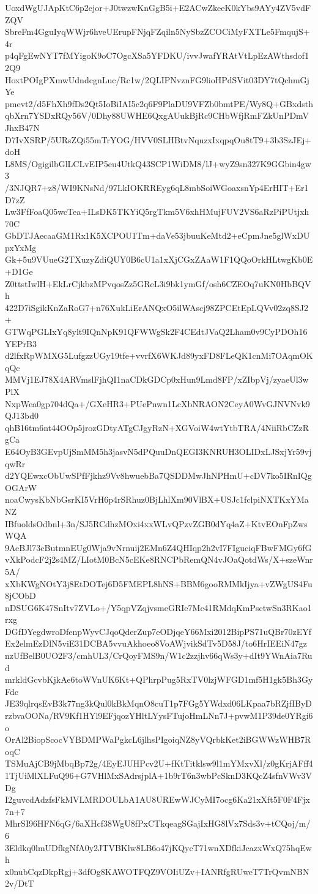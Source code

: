 UoxdWgUJApKtC6p2ejor+J0twzwKnGgB5i+E2ACwZkeeK0kYbs9AYy4ZV5vdFZQV
SbreFm4GguIyqWWjr6hveUErupFNjqFZqiln5NySbzZCOCiMyFXTLe5FmqujS+4r
p4qFgEwNYT7fMYigoK9oC7OgcXSa5YFDKU/ivvJwafYRAtVtLpEzAWthsdof12Q9
HoxtPOIgPXmwUdndcgnLuc/Rc1w/2QLIPNvznFG9lioHPdSVit03DY7tQchmGjYe
pmevt2/d5FhXh9fDs2Qt5IoBiIAI5c2q6F9PlaDU9VFZb0bmtPE/Wy8Q+GBxdsth
qbXrn7YSDxRQy56V/0Dhy88UWHE6QxgAUukBjRc9CHbWfjRmFZkUnPDmVJhxB47N
D7IvXSRP/5URsZQi55mTrYOG/HVV0SLHBtvNquzxIxqpqOu8tT9+3b3SzJEj+doH
L8MS/OgigilbGlLCLvEIP5eu4UtkQ43SCP1WiDM8/lJ+wyZ9sn327K9GGbin4gw3
/3NJQR7+z8/WI9KNsNd/97LkIOKRREyg6qL8mbSoiWGoaxsnYp4ErHIT+Er1D7zZ
Lw3FfFoaQ05wcTea+ILsDK5TKYiQ5rgTkm5V6xhHMujFUV2VS6aRzPiPUtjxh70C
GbDTJAecaaGM1Rx1K5XCPOU1Tm+daVe53jbuuKeMtd2+eCpmJne5glWxDUpxYxMg
Gk+5u9VUueG2TXuzyZdiQUY0B6cU1a1xXjCGxZAaW1F1QQoOrkHLtwgKb0E+D1Ge
Z0ttstIwlH+EkLrCjkbzMPvqosZz5GReL3i9bk1ymGf/osh6CZEOq7uKN0HbBQVh
422D7iSgikKnZaRoG7+n76XukLiErANQxO5ilWAscj98ZPCEtEpLQVv02zq8SJ2+
GTWqPGLIxYq8ylt9IQnNpK91QFWWgSk2F4CEdtJVaQ2Lham0v9CyPDOh16YEPrB3
d2lfxRpWMXG5LufgzzUGy19tfe+vvrfX6WKJd89yxFD8FLeQK1cnMi7OAqmOKqQc
MMVj1EJ78X4ARVmslFjhQI1naCDkGDCp0xHun9Lmd8FP/xZIbpVj/zyaeUl3wPlX
NxpWea0gp704dQa+/GXeHR3+PUePnwn1LcXbNRAON2CeyA0WvGJNVNvk9QJ13bd0
qhB16tm6nt44OOp5jrozGDtyATgCJgyRzN+XGVoiW4wtYtbTRA/4NiiRbCZzRgCa
E64OyB3GEvpUjSmMM5h3jasvN5dPQuuDnQEGI3KNRUH3OLIDxLJSxjYr59vjqwRr
d2YQEwxcObUwSPfFjkhz9Vv8hwuebBa7QSDDMwJhNPHmU+cDV7ko5IRnIQgOGArW
noaCwysKbNbGsrKI5VrH6p4rSRhuz0BjLhlXm90VlBX+USJc1fclpiNXTKxYMaNZ
IBfuoldsOdbnl+3n/SJ5RCdhzMOxi4xxWLvQPzvZGB0dYq4aZ+KtvEOnFpZwsWQA
9AeBJl73cButmnEUg0Wja9vNrnuij2EMn6Z4QHIqp2h2vI7FIguciqFBwFMGy6fG
vXkPodcF2j2s4MZ/LIotM0BcN5cEKe8RNCPbRemQN4vJOaQotdWs/X+szeWnr5A/
xXbKWgNOtY3j8EtDOTej6D5FMEPL8hNS+BBM6gooRMMkIjya+vZWgUS4Fu8jCObD
nDSUG6K47SnItv7ZVLo+/Y5qpVZqjvsmeGRIe7Mc41RMdqKmPsctwSn3RKao1rxg
DGfDYegdwroDfenpWyvCJqoQderZup7eODjqeY66Mxi2012BipPS71uQBr70zEYf
Ex2elmEzDlN5viE31DCBA5vvuAkhoeo8VoAWjvikSdTv5D58J/to6HrIEEiN47gz
nzUfBelB0UO2F3/cmhUL3/CrQoyFMS9n/W1c2zzjhv66qWs3y+dIt9YWnAia7Rud
mrkldGcvbKjkAe6toWVnUK6Kt+QPhrpPug5RxTV0lzjWFGD1mf5H1gk5Bh3GyFdc
JE39qlrqsEvB3k77ng3kQul0kBkMqnO8cuT1p7FGg5YWdxd06LKpaa7bRZjfIByD
rzbvaOONa/RV9Kf1HYl9EFjqozYHltLYysFTujoHmLNn7J+pvwM1P39de0YRgi6o
OrAl2BiopScocVYBDMPWaPgkcL6jlhsPIgoiqNZ8yVQrbkKet2iBGWWzWHB7RoqC
TSMuAjCB9jMbqBp72g/4EyEJUHPcv2U+fKtTitklsw9l1mYMxvXl/z0gKrjAFff4
1TjUiMlXLFuQ96+G7VHlMxSAdrsjplA+1b9rT6n3wbPcSknD3KQcZ4sfnVWv3VDg
I2guvcdAdzfsFkMVLMRDOULbA1AU8UREwWJCyMI7ocg6Ka21xXft5F0F4Fjx7n+7
MhrSI96HFN6qG/6aXHcf38WgU8fPxCTkqeagSGajIxHG8lVx7Sds3v+tCQoj/m/6
3Eldkq0lmUDfkgNfA0y2JTVBKlw8LB6o47jKQycT71wnXDfkiJcazxWxQ75hqEwh
x0nubCqzDkpRgj+3dfOg8KAWOTFQZ9VOIiUZv+IANRfgRUweT7TrQvmNBN2v/DtT
